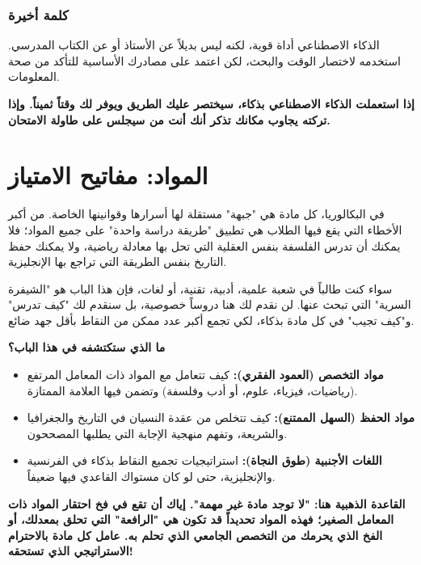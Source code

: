 \documentclass[12pt,a4paper]{book}
\newcommand{\importantAr}[1]{%
	\begin{important}
		\bfseries #1
	\end{important}
}
\begin{document}
\subsection{كلمة أخيرة}
الذكاء الاصطناعي أداة قوية، لكنه ليس بديلاً عن الأستاذ أو عن الكتاب المدرسي. استخدمه لاختصار الوقت والبحث، لكن اعتمد على مصادرك الأساسية للتأكد من صحة المعلومات.

\importantAr{ إذا استعملت الذكاء الاصطناعي بذكاء، سيختصر عليك الطريق ويوفر لك وقتاً ثميناً. وإذا تركته يجاوب مكانك تذكر أنك أنت من سيجلس على طاولة الامتحان.}

	
	
	
	\chapter{المواد: مفاتيح الامتياز}
	\label{sec:owner-experiences10}
	\label{chap:scientific}
	

في البكالوريا، كل مادة هي "جبهة" مستقلة لها أسرارها وقوانينها الخاصة. من أكبر الأخطاء التي يقع فيها الطلاب هي تطبيق "طريقة دراسة واحدة" على جميع المواد؛ فلا يمكنك أن تدرس الفلسفة بنفس العقلية التي تحل بها معادلة رياضية، ولا يمكنك حفظ التاريخ بنفس الطريقة التي تراجع بها الإنجليزية.

سواء كنت طالباً في شعبة علمية، أدبية، تقنية، أو لغات، فإن هذا الباب هو "الشيفرة السرية" التي تبحث عنها. لن نقدم لك هنا دروساً خصوصية، بل سنقدم لك "كيف تدرس" و"كيف تجيب" في كل مادة بذكاء، لكي تجمع أكبر عدد ممكن من النقاط بأقل جهد ضائع.

\textbf{ما الذي ستكتشفه في هذا الباب؟}
\begin{itemize}
	\item \textbf{مواد التخصص (العمود الفقري):} كيف تتعامل مع المواد ذات المعامل المرتفع (رياضيات، فيزياء، علوم، أو أدب وفلسفة) وتضمن فيها العلامة الممتازة.
	\item \textbf{مواد الحفظ (السهل الممتنع):} كيف تتخلص من عقدة النسيان في التاريخ والجغرافيا والشريعة، وتفهم منهجية الإجابة التي يطلبها المصححون.
	\item \textbf{اللغات الأجنبية (طوق النجاة):} استراتيجيات تجميع النقاط بذكاء في الفرنسية والإنجليزية، حتى لو كان مستواك القاعدي فيها ضعيفاً.
\end{itemize}

\importantAr{القاعدة الذهبية هنا: "لا توجد مادة غير مهمة". إياك أن تقع في فخ احتقار المواد ذات المعامل الصغير؛ فهذه المواد تحديداً قد تكون هي "الرافعة" التي تحلق بمعدلك، أو الفخ الذي يحرمك من التخصص الجامعي الذي تحلم به. عامل كل مادة بالاحترام الاستراتيجي الذي تستحقه!}
	
\end{document}

